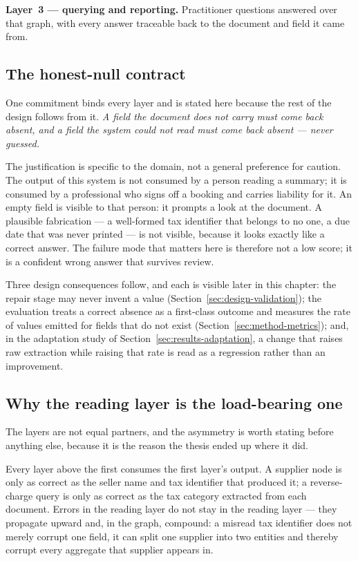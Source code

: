 \textbf{Layer~3 --- querying and reporting.} Practitioner questions answered over that
graph, with every answer traceable back to the document and field it came from.

\subsection{The honest-null contract}
\label{sec:design-honest-null}

One commitment binds every layer and is stated here because the rest of the design follows
from it. \emph{A field the document does not carry must come back absent, and a field the
system could not read must come back absent --- never guessed.}

The justification is specific to the domain, not a general preference for caution. The
output of this system is not consumed by a person reading a summary; it is consumed by a
professional who signs off a booking and carries liability for it. An empty field is visible to
that person: it prompts a look at the document. A plausible fabrication --- a well-formed tax
identifier that belongs to no one, a due date that was never printed --- is not visible,
because it looks exactly like a correct answer. The failure mode that matters here is
therefore not a low score; it is a confident wrong answer that survives review.

Three design consequences follow, and each is visible later in this chapter: the repair stage
may never invent a value (Section~\ref{sec:design-validation}); the evaluation treats a correct
absence as a first-class outcome and measures the rate of values emitted for fields that do
not exist (Section~\ref{sec:method-metrics}); and, in the adaptation study of
Section~\ref{sec:results-adaptation}, a change that raises raw extraction while raising that rate is
read as a regression rather than an improvement.

\subsection{Why the reading layer is the load-bearing one}

The layers are not equal partners, and the asymmetry is worth stating before anything else,
because it is the reason the thesis ended up where it did.

Every layer above the first consumes the first layer's output. A supplier node is only as
correct as the seller name and tax identifier that produced it; a reverse-charge query is
only as correct as the tax category extracted from each document. Errors in the reading
layer do not stay in the reading layer --- they propagate upward and, in the graph, compound:
a misread tax identifier does not merely corrupt one field, it can split one supplier into
two entities and thereby corrupt every aggregate that supplier appears in.

